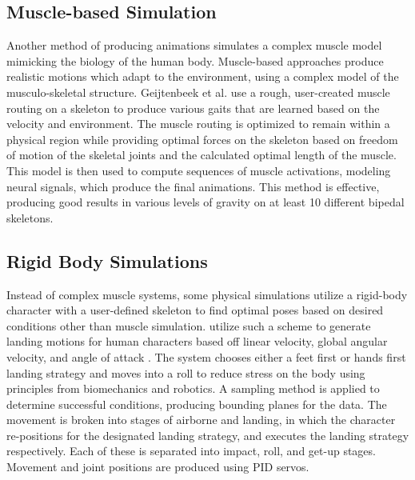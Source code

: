 \subsection{Muscle-based Simulation}
\label{subsection:muscle_sim_bg}
Another method of producing animations simulates a complex muscle model mimicking the biology of the human body. Muscle-based approaches produce realistic motions which adapt to the environment, using a complex model of the musculo-skeletal structure. Geijtenbeek et al.\cite{muscle_based_bipeds} use a rough, user-created muscle routing on a skeleton to produce various gaits that are learned based on the velocity and environment.  The muscle routing is optimized to remain within a physical region while providing optimal forces on the skeleton based on freedom of motion of the skeletal joints and the calculated optimal length of the muscle.  This model is then used to compute sequences of muscle activations, modeling neural signals, which produce the final animations.  This method is effective, producing good results in various levels of gravity on at least 10 different bipedal skeletons.

		

\subsection{Rigid Body Simulations}
\label{subsection:rigid_body_bg}
Instead of complex muscle systems, some physical simulations utilize a rigid-body character with a user-defined skeleton to find optimal poses based on desired conditions other than muscle simulation.  \liufall{} utilize such a scheme to generate landing motions for human characters based off linear velocity, global angular velocity, and angle of attack  \cite{falling_landing}.  The system chooses either a feet first or hands first landing strategy and moves into a roll to reduce stress on the body using principles from biomechanics and robotics.  A sampling method is applied to determine successful conditions, producing bounding planes for the data.  The movement is broken into stages of airborne and landing, in which the character re-positions for the designated landing strategy, and executes the landing strategy respectively. Each of these is separated into impact, roll, and get-up stages.  Movement and joint positions are produced using PID servos.  

